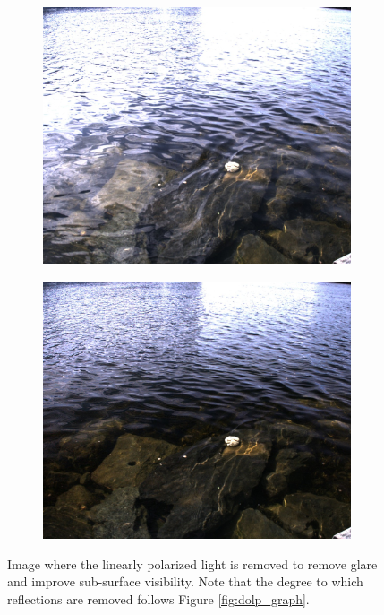 \begin{figure}[H]
    \begin{subfigure}[T]{.49\textwidth}
        \includegraphics[width=\textwidth]{figures/pictures/img_4722_s0.jpg}
    \end{subfigure} \hfill
    \begin{subfigure}[T]{.49\textwidth}
        \includegraphics[width=\textwidth]{figures/pictures/img_4722_unpol.jpg}
    \end{subfigure}
    \caption{Image where the linearly polarized light is removed to remove glare and improve sub-surface visibility. Note that the degree to which reflections are removed follows Figure \ref{fig:dolp_graph}.
    }
\end{figure}
\vspace{-.5cm}

